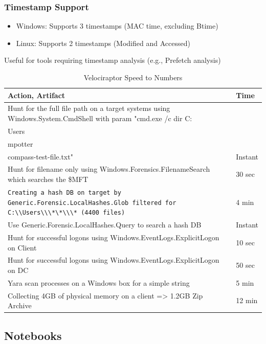 \subsubsection*{Timestamp Support}
\begin{itemize}
   \item Windows: Supports 3 timestamps (MAC time, excluding Btime)
   \item Linux: Supports 2 timestamps (Modified and Accessed)
\end{itemize}

Useful for tools requiring timestamp analysis (e.g., Prefetch analysis)

\begin{table}[h]
\begin{tabular}{|p{}|p{}|}
\hline
\textbf{Action, Artifact} & \textbf{Time} \\
\hline
Hunt for the full file path on a target systems using Windows.System.CmdShell with param "cmd.exe /c dir C:\\Users\\mpotter\\compass-test-file.txt" & Instant \\
\hline
Hunt for filename only using Windows.Forensics.FilenameSearch which searches the \$MFT & 30 sec \\
\hline
\lstinline|Creating a hash DB on target by Generic.Forensic.LocalHashes.Glob filtered for C:\\Users\\\*\*\\\* (4400 files)| & 4 min \\
\hline
Use Generic.Forensic.LocalHashes.Query to search a hash DB & Instant \\
\hline
Hunt for successful logons using Windows.EventLogs.ExplicitLogon on Client & 10 sec \\
\hline
Hunt for successful logons using Windows.EventLogs.ExplicitLogon on DC & 50 sec \\
\hline
Yara scan processes on a Windows box for a simple string & 5 min \\
\hline
Collecting 4GB of physical memory on a client => 1.2GB Zip Archive & 12 min \\
\hline
\end{tabular}
\caption{Velociraptor Speed to Numbers}
\end{table}

\subsection{Notebooks}

